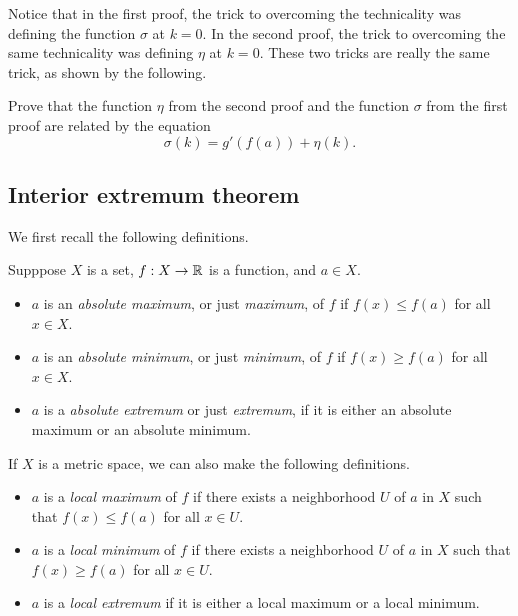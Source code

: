 Notice that in the first proof, the trick to overcoming the technicality was defining the function $\sigma$ at $k = 0$. In the second proof, the trick to overcoming the same technicality was defining $\eta$ at $k = 0$. These two tricks are really the same trick, as shown by the following.  

\begin{exercise}
	Prove that the function $\eta$ from the second proof and the function $\sigma$ from the first proof are related by the equation
	\[ \sigma(k) = g'(f(a)) + \eta(k). \]
\end{exercise}

\subsection{Interior extremum theorem}

We first recall the following definitions. 

\begin{definition}      
	Supppose $X$ is a set, $f : X \to \mathbb{R}$ is a function, and $a \in X$. 
	\begin{itemize}
		\item $a$ is an \emph{absolute maximum}, or just \emph{maximum}, of $f$ if $f(x) \leq f(a)$ for all $x \in X$. 
		\item $a$ is an \emph{absolute minimum}, or just \emph{minimum}, of $f$ if $f(x) \geq f(a)$ for all $x \in X$. 
		\item $a$ is a \emph{absolute extremum} or just \emph{extremum}, if it is either an absolute maximum or an absolute minimum.
	\end{itemize}
	If $X$ is a metric space\footnotemark, we can also make the following definitions. 
	\begin{itemize}
		\item $a$ is a \emph{local maximum} of $f$ if there exists a neighborhood $U$ of $a$ in $X$ such that $f(x) \leq f(a)$ for all $x \in U$. 
		\item $a$ is a \emph{local minimum} of $f$ if there exists a neighborhood $U$ of $a$ in $X$ such that $f(x) \geq f(a)$ for all $x \in U$. 
		\item $a$ is a \emph{local extremum} if it is either a local maximum or a local minimum.
	\end{itemize}
\end{definition}

